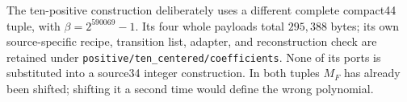 The ten-positive construction deliberately uses a different complete
compact44 tuple, with $\beta=2^{590069}-1$. Its four whole payloads total
$295{,}388$ bytes; its own source-specific recipe, transition list, adapter,
and reconstruction check are retained under
\texttt{positive/ten\_centered/coefficients}. None of its ports is substituted
into a source34 integer construction. In both tuples $M_F$ has already been
shifted; shifting it a second time would define the wrong polynomial.
